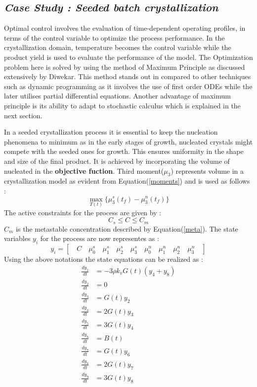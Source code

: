 \documentclass[3p,times]{elsarticle}
\begin{document}
\subsection{\textit{Case Study : Seeded batch crystallization}}
Optimal control involves the evaluation of time-dependent operating profiles, in terms of the control variable to optimize the process performance. In the crystallization domain, temperature becomes the control variable while the product yield is used to evaluate the performance of the model. The Optimization problem here is solved by using the method of Maximum Principle as discussed extensively by Diwekar\cite{dewikar}. This method stands out in compared to other techniques such as dynamic programming as it involves the use of first order ODEs while the later utilises partial differential equations. Another advantage of maximum principle is its ability to adapt to stochastic calculus which is explained in the next section. \par 
In a seeded crystallization process it is essential to keep the nucleation phenomena to minimum as in the early stages of growth, nucleated crystals might compete with the seeded ones for growth. This ensures uniformity in the shape and size of the final product. It is achieved by incorporating the volume of nucleated in the \textbf{objective fuction}. Third moment($\mu_{3}$) represents volume in a crystallization model as evident from Equation(\ref{moments}) and is used as follows :
\begin{equation}
\max_{T(t)}\lbrace{\mu_{3}^{s}(t_{f}) - \mu_{3}^{n}(t_{f})\rbrace } 
\end{equation}
The active constraints for the process are given by : 
\begin{equation}
C_{s}\leqslant C \leqslant C_{m}
\end{equation}
$C_{m}$ is the metastable concentration described by Equation(\ref{meta}). The state variables $y_{i}$ for the process are now representes as : 
\begin{equation} \label{states}
y_{i} = \left[\quad C \quad \mu_{0}^{s} \quad \mu_{1}^{s}\quad \mu_{2}^{s}\quad \mu_{3}^{s}\quad \mu_{0}^{n}\quad \mu_{1}^{n}\quad \mu_{2}^{n}\quad \mu_{3}^{n}\quad\right]  
\end{equation}
Using the above notations the state equations can be realized as \cite{yenkie} :
\begin{align} 
\frac{dy_{1}}{dt} &= -3\rho k_{v}G(t)(y_{4}+y_{8}) \label{eq1}\\
\frac{dy_{2}}{dt} &= 0 \label{eq2}\\
\frac{dy_{3}}{dt} &= G(t)y_{2} \label{eq3} \\
\frac{dy_{4}}{dt} &= 2G(t)y_{3} \label{eq4}\\
\frac{dy_{5}}{dt} &= 3G(t)y_{4} \label{eq5}\\
\frac{dy_{6}}{dt} &= B(t)  \label{eq6}\\
\frac{dy_{7}}{dt} &= G(t)y_{6}  \label{eq7}\\
\frac{dy_{8}}{dt} &= 2G(t)y_{7} \label{eq8} \\
\frac{dy_{9}}{dt} &= 3G(t)y_{8} \label{eq9} \\
\end{align} 
\end{document}
